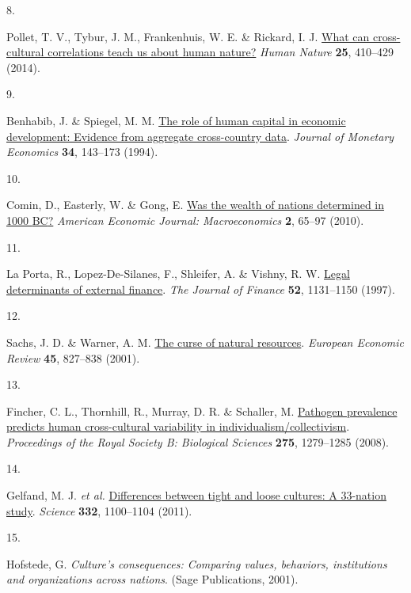 \documentclass[
  man,floatsintext]{apa6}
\newlength{\cslhangindent}
\newlength{\csllabelwidth}
\newlength{\cslentryspacingunit} %
\newenvironment{CSLReferences}[2] %
 {%
  \setlength{\parindent}{0pt}
  \ifodd #1
  \let\oldpar\par
  \def\par{\hangindent=\cslhangindent\oldpar}
  \fi
  \setlength{\parskip}{#2\cslentryspacingunit}
 }%
 {}
\newcommand{\CSLLeftMargin}[1]{\parbox[t]{\csllabelwidth}{#1}}
\newcommand{\CSLRightInline}[1]{\parbox[t]{\linewidth - \csllabelwidth}{#1}\break}
\begin{document}
\begin{CSLReferences}{0}{0}
\leavevmode{}%
\CSLLeftMargin{8. }%
\CSLRightInline{Pollet, T. V., Tybur, J. M., Frankenhuis, W. E. \& Rickard, I. J. \href{https://doi.org/10.1007/s12110-014-9206-3}{What can cross-cultural correlations teach us about human nature?} \emph{Human Nature} \textbf{25}, 410--429 (2014).}

\leavevmode{}%
\CSLLeftMargin{9. }%
\CSLRightInline{Benhabib, J. \& Spiegel, M. M. \href{https://doi.org/10.1016/0304-3932(94)90047-7}{The role of human capital in economic development: Evidence from aggregate cross-country data}. \emph{Journal of Monetary Economics} \textbf{34}, 143--173 (1994).}

\leavevmode{}%
\CSLLeftMargin{10. }%
\CSLRightInline{Comin, D., Easterly, W. \& Gong, E. \href{http://www.jstor.org/stable/25760309}{Was the wealth of nations determined in 1000 {BC}?} \emph{American Economic Journal: Macroeconomics} \textbf{2}, 65--97 (2010).}

\leavevmode{}%
\CSLLeftMargin{11. }%
\CSLRightInline{La Porta, R., Lopez-De-Silanes, F., Shleifer, A. \& Vishny, R. W. \href{https://doi.org/10.1111/j.1540-6261.1997.tb02727.x}{Legal determinants of external finance}. \emph{The Journal of Finance} \textbf{52}, 1131--1150 (1997).}

\leavevmode{}%
\CSLLeftMargin{12. }%
\CSLRightInline{Sachs, J. D. \& Warner, A. M. \href{https://doi.org/10.1016/S0014-2921(01)00125-8}{The curse of natural resources}. \emph{European Economic Review} \textbf{45}, 827--838 (2001).}

\leavevmode{}%
\CSLLeftMargin{13. }%
\CSLRightInline{Fincher, C. L., Thornhill, R., Murray, D. R. \& Schaller, M. \href{https://doi.org/10.1098/rspb.2008.0094}{Pathogen prevalence predicts human cross-cultural variability in individualism/collectivism}. \emph{Proceedings of the Royal Society B: Biological Sciences} \textbf{275}, 1279--1285 (2008).}

\leavevmode{}%
\CSLLeftMargin{14. }%
\CSLRightInline{Gelfand, M. J. \emph{et al.} \href{https://doi.org/10.1126/science.1197754}{Differences between tight and loose cultures: A 33-nation study}. \emph{Science} \textbf{332}, 1100--1104 (2011).}

\leavevmode{}%
\CSLLeftMargin{15. }%
\CSLRightInline{Hofstede, G. \emph{Culture's consequences: Comparing values, behaviors, institutions and organizations across nations}. (Sage Publications, 2001).}


\end{CSLReferences}
\end{document}
